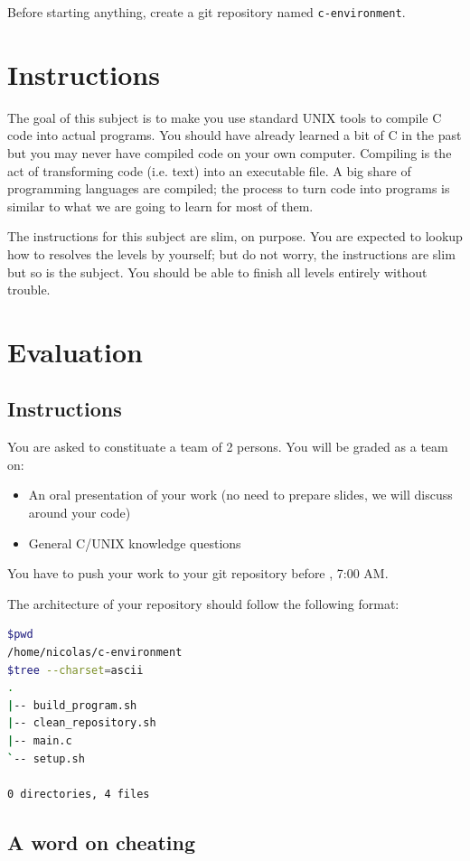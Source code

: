 \documentclass[12pt]{article}
\begin{document}
Before starting anything, create a git repository named \texttt{c-environment}.

\section{Instructions}

The goal of this subject is to make you use standard UNIX tools to compile C code into actual programs. You should have already learned a bit of C in the past but you may never have compiled code on your own computer.
Compiling is the act of transforming code (i.e. text) into an executable file. A big share of programming languages are compiled; the process to turn code into programs is similar to what we are going to learn for most of them.

The instructions for this subject are slim, on purpose. You are expected to lookup how to resolves the levels by yourself; but do not worry, the instructions are slim but so is the subject. You should be able to finish all levels entirely without trouble.

\section{Evaluation}
\subsection{Instructions}

You are asked to constituate a team of 2 persons. You will be graded as a team on:
\begin{itemize}
	\item An oral presentation of your work (no need to prepare slides, we will discuss around your code)
	\item General C/UNIX knowledge questions
\end{itemize}

You have to push your work to your git repository before , 7:00 AM.

The architecture of your repository should follow the following format:
\begin{lstlisting}[language=bash]
$pwd
/home/nicolas/c-environment
$tree --charset=ascii
.
|-- build_program.sh
|-- clean_repository.sh
|-- main.c
`-- setup.sh

0 directories, 4 files
\end{lstlisting}

\subsection{A word on cheating}
\end{document}
